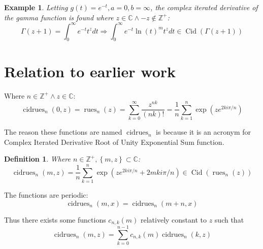 \documentclass[]{article}
\DeclareMathOperator{\rues}{rues}
\DeclareMathOperator{\Cid}{Cid}
\DeclareMathOperator{\cidrues}{cidrues}
\newcommand{\pqty}[1]{{\left(#1\right)}}
\newcommand{\Bqty}[1]{{\left\{#1\right\}}}
\newtheorem{example}{Example}[section]
\newtheorem{definition}[theorem]{Definition}
\numberwithin{equation}{section}
\begin{document}
	\begin{example}
		Letting $g\pqty{t}=e^{-t},a=0,b=\infty$, the complex iterated derivative of the gamma function is found where $z\in\mathbb{C}\land -z\not\in\mathbb{Z}^+$:
		\begin{equation}
			\Gamma\pqty{z+1} = \int_{0}^{\infty}e^{-t}t^z dt
			\Rightarrow
			\int_{0}^{\infty}e^{-t}\ln\pqty{t}^m t^z dt\in\Cid\pqty{\Gamma\pqty{z+1}}
		\end{equation}
	\end{example}
	
	\section{Relation to earlier work}
	Where \(n\in\mathbb{Z}^+\land z\in\mathbb{C}\):
	\begin{equation}
		\cidrues_n\pqty{0,z}=
		\rues_n\pqty{z}=
		\sum_{k=0}^{\infty}\frac{z^{nk}}{\pqty{nk}!}=
		\frac{1}{n}\sum _{k=1}^n \exp\pqty{ze^{2ki\pi/n}}
	\end{equation}
	
	The reason these functions are named $\cidrues_n$ is because it is an acronym for Complex Iterated Derivative Root of Unity Exponential Sum function.
	\begin{definition}
		Where $n\in\mathbb{Z}^+,\Bqty{m,z}\subset\mathbb{C}$:
		\begin{equation}
			\label{cidrues Exponential sum form}
			\cidrues_n\pqty{m,z}=
			\frac{1}{n}\sum _{k=1}^n \exp\pqty{ze^{2ki\pi/n}+2mki\pi/n}
			\in\Cid\pqty{\rues_n\pqty{z}}
		\end{equation}
	\end{definition}
	The functions are periodic:
	\begin{equation}
		\cidrues_n\pqty{m,x}=\cidrues_n\pqty{m+n,x}
	\end{equation}

	Thus there exists some functions $c_{n,k}\pqty{m}$ relatively constant to $z$ such that
	\begin{equation}
		\cidrues_n\pqty{m,z}=\sum_{k=0}^{n-1}c_{n,k}\pqty{m}\cidrues_n\pqty{k,z}
	\end{equation}
	
\end{document}
